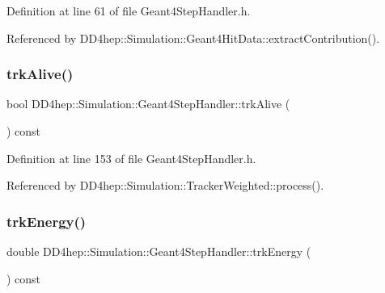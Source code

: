 Definition at line 61 of file Geant4\+Step\+Handler.\+h.



Referenced by D\+D4hep\+::\+Simulation\+::\+Geant4\+Hit\+Data\+::extract\+Contribution().

\hypertarget{class_d_d4hep_1_1_simulation_1_1_geant4_step_handler_a37df3c141c8f16fbad4f17bf32a4538b}{}\label{class_d_d4hep_1_1_simulation_1_1_geant4_step_handler_a37df3c141c8f16fbad4f17bf32a4538b} 
\subsubsection{\texorpdfstring{trk\+Alive()}{trkAlive()}}
{\footnotesize\ttfamily bool D\+D4hep\+::\+Simulation\+::\+Geant4\+Step\+Handler\+::trk\+Alive (\begin{DoxyParamCaption}{ }\end{DoxyParamCaption}) const\hspace{0.3cm}{\ttfamily [inline]}}



Definition at line 153 of file Geant4\+Step\+Handler.\+h.



Referenced by D\+D4hep\+::\+Simulation\+::\+Tracker\+Weighted\+::process().

\hypertarget{class_d_d4hep_1_1_simulation_1_1_geant4_step_handler_a41eb8945c98180d3da922d1781504bad}{}\label{class_d_d4hep_1_1_simulation_1_1_geant4_step_handler_a41eb8945c98180d3da922d1781504bad} 
\subsubsection{\texorpdfstring{trk\+Energy()}{trkEnergy()}}
{\footnotesize\ttfamily double D\+D4hep\+::\+Simulation\+::\+Geant4\+Step\+Handler\+::trk\+Energy (\begin{DoxyParamCaption}{ }\end{DoxyParamCaption}) const\hspace{0.3cm}{\ttfamily [inline]}}




